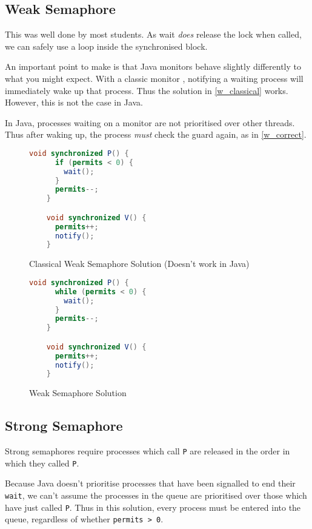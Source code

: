 \documentclass{article}
\begin{document}
\subsection{Weak Semaphore}

This was well done by most students. As wait \emph{does} release the lock
when called, we can safely use a loop inside the synchronised block.

An important point to make is that Java monitors behave slightly differently
to what you might expect. With a classic monitor \cite{HoareMonitors},
notifying a waiting process will immediately wake up that process.
Thus the solution in \autoref{w_classical} works.
However, this is not the case in Java.

In Java, processes waiting on a monitor are not prioritised over
other threads. Thus after waking up,
the process \emph{must} check the guard again, as in \autoref{w_correct}.

\begin{figure}
  \begin{lstlisting}[language=java,basicstyle=\small\ttfamily]
    void synchronized P() {
      if (permits < 0) {
        wait();
      }
      permits--;
    }

    void synchronized V() {
      permits++;
      notify();
    }
  \end{lstlisting}
  \caption{Classical Weak Semaphore Solution (Doesn't work in Java)}
  \label{w_classical}
\end{figure}

\begin{figure}
  \begin{lstlisting}[language=java,basicstyle=\small\ttfamily]
    void synchronized P() {
      while (permits < 0) {
        wait();
      }
      permits--;
    }

    void synchronized V() {
      permits++;
      notify();
    }
  \end{lstlisting}
  \caption{Weak Semaphore Solution}
  \label{w_correct}
\end{figure}

\subsection{Strong Semaphore}

Strong semaphores require processes which call \texttt{P}
are released in the order in which they called \texttt{P}.

Because Java doesn't prioritise processes that have been signalled to
end their \texttt{wait}, we can't assume the processes in the queue are
prioritised over those which have just called \texttt{P}.
Thus in this solution, every process must be entered into the queue,
regardless of whether \texttt{permits > 0}.
\end{document}
